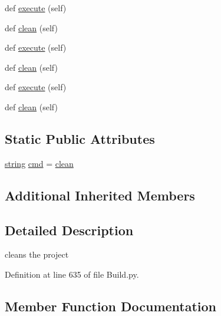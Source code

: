 \begin{DoxyCompactItemize}
\item 
def \hyperlink{classwaflib_1_1_build_1_1_clean_context_a1538df152852c7d957ae1e548eb04e4d}{execute} (self)
\item 
def \hyperlink{classwaflib_1_1_build_1_1_clean_context_a31a23b3781da365c034b7225c4aad31a}{clean} (self)
\item 
def \hyperlink{classwaflib_1_1_build_1_1_clean_context_a1538df152852c7d957ae1e548eb04e4d}{execute} (self)
\item 
def \hyperlink{classwaflib_1_1_build_1_1_clean_context_a31a23b3781da365c034b7225c4aad31a}{clean} (self)
\item 
def \hyperlink{classwaflib_1_1_build_1_1_clean_context_a1538df152852c7d957ae1e548eb04e4d}{execute} (self)
\item 
def \hyperlink{classwaflib_1_1_build_1_1_clean_context_a31a23b3781da365c034b7225c4aad31a}{clean} (self)
\end{DoxyCompactItemize}
\subsection*{Static Public Attributes}
\begin{DoxyCompactItemize}
\item 
\hyperlink{test__lib_f_l_a_c_2format_8c_ab02026ad0de9fb6c1b4233deb0a00c75}{string} \hyperlink{classwaflib_1_1_build_1_1_clean_context_a493ed87f1e0d8e1119ad5c6499a28354}{cmd} = \textquotesingle{}\hyperlink{classwaflib_1_1_build_1_1_clean_context_a31a23b3781da365c034b7225c4aad31a}{clean}\textquotesingle{}
\end{DoxyCompactItemize}
\subsection*{Additional Inherited Members}


\subsection{Detailed Description}
\begin{DoxyVerb}cleans the project\end{DoxyVerb}
 

Definition at line 635 of file Build.\+py.



\subsection{Member Function Documentation}
